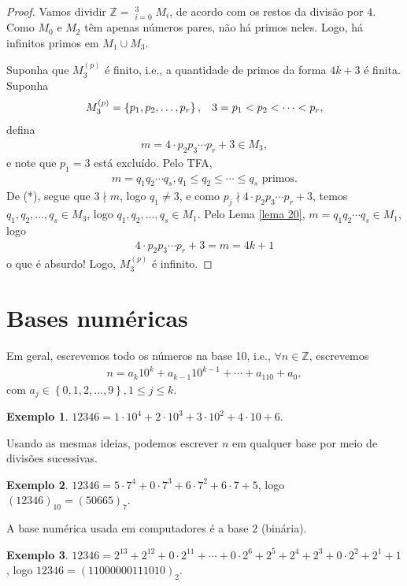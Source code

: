 \documentclass[a4paper,11pt,twoside, leqno]{article}
\theoremstyle{definition}
\newtheorem*{example}{Exemplo}
\begin{document}
\begin{proof}
	Vamos dividir $\mathbb{Z} = \displaystyle{\mathop{\dot\bigcup}_{i=0}^{3} M_i}$, de acordo com os restos da divisão por $4$. Como $M_0$ e $M_2$ têm apenas números pares, não há primos neles. Logo, há infinitos primos em $\displaystyle{ M_1\cup M_3 }$.
	
	Suponha que $M_3^{(p)}$ é finito, i.e., a quantidade de primos da forma $4k+3$ é finita. Suponha
	\begin{align*}
	M_3^{(p)} = \left\{ p_1,p_2,\dots,p_r \right\}, \hspace{0.3cm} 3 = p_1 < p_2 < \cdots < p_r,
	\end{align*}
	defina
	\begin{align*}
	\tag{*}
	m = 4\cdot p_2p_3\cdots p_r + 3\in M_3,
	\end{align*}
	e note que $p_1 = 3$ está excluído. Pelo TFA,
	\begin{align*}
	m = q_1q_2\cdots q_s, q_1\leq q_2\leq \cdots \leq q_s \text{ primos}.
	\end{align*}
	De (*), segue que $3\nmid m$, logo $q_1\neq 3$, e como $p_j\nmid 4\cdot p_2p_3\cdots p_r + 3$, temos $q_1, q_2, \dots, q_s\in M_3$, logo $q_1, q_2, \dots, q_s\in M_1$. Pelo Lema \eqref{lema 20}, $m = q_1q_2\cdots q_s\in M_1$, logo
	\begin{align*}
	4\cdot p_2p_3\cdots p_r + 3 = m = 4k + 1
	\end{align*}
	o que é absurdo! Logo, $M_3^{(p)}$ é infinito.
\end{proof}
\section{Bases numéricas}
\hspace{12pt} Em geral, escrevemos todo os números na base 10, i.e., $\forall n\in\mathbb{Z}$, escrevemos
\begin{align*}
n = a_k10^k + a_{k-1}10^{k-1} + \cdots + a_110 + a_0,
\end{align*}
com $a_j\in\left\{ 0,1,2,\dots,9 \right\}, 1\leq j\leq k$.
\begin{example}
	$12346 = 1\cdot 10^4 + 2\cdot 10^3 + 3\cdot 10^2 + 4\cdot 10 + 6$.
\end{example}
Usando as mesmas ideias, podemos escrever $n$ em qualquer base por meio de divisões sucessivas.
\begin{example}
	$12346 = 5\cdot 7^4 + 0\cdot 7^3 + 6\cdot 7^2 + 6\cdot 7 + 5$, logo $(12346)_{10} = (50665)_7$.
\end{example}
A base numérica usada em computadores é a base $2$ (binária).
\begin{example}
	$12346 = 2^{13} + 2^{12} + 0\cdot 2^{11} + \cdots + 0\cdot 2^6 + 2^5 + 2^4 + 2^3 + 0\cdot 2^2 + 2^1 + 1$, logo $12346 = (11000000111010)_2$.
\end{example}
\end{document}
